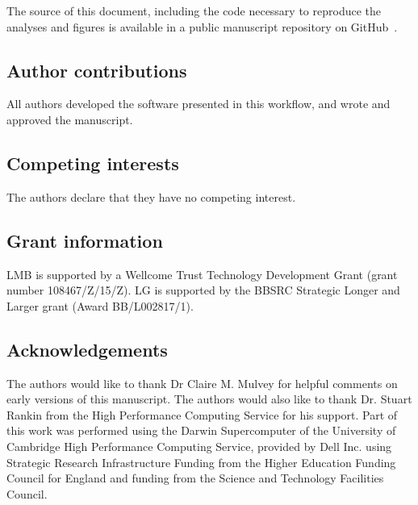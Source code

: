 The source of this document, including the code necessary to reproduce
the analyses and figures is available in a public manuscript
repository on GitHub~\cite{ghrepo}.

\bigskip

\subsection*{Author contributions}

All authors developed the software presented in this workflow, and
wrote and approved the manuscript.

\subsection*{Competing interests}

The authors declare that they have no competing interest. 

\subsection*{Grant information}

LMB is supported by a Wellcome Trust Technology Development Grant
(grant number 108467/Z/15/Z). LG is supported by the BBSRC Strategic
Longer and Larger grant (Award BB/L002817/1).


\subsection*{Acknowledgements}

The authors would like to thank Dr Claire M. Mulvey for helpful
comments on early versions of this manuscript. The authors would also
like to thank Dr. Stuart Rankin from the High Performance Computing
Service for his support. Part of this work was performed using the
Darwin Supercomputer of the University of Cambridge High Performance
Computing Service, provided by Dell Inc. using Strategic Research
Infrastructure Funding from the Higher Education Funding Council for
England and funding from the Science and Technology Facilities
Council.
